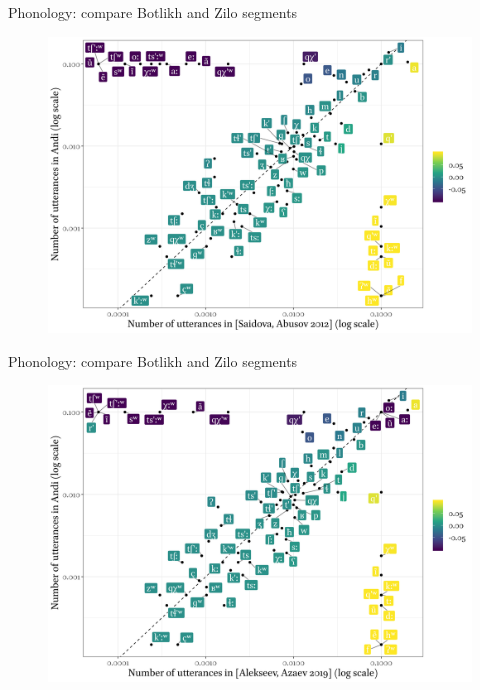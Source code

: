 \begin{frame}{Phonology: compare Botlikh and Zilo segments}
\begin{figure}[h]
\centering
\includegraphics[width = \linewidth]{images/06_compare_botlikh_zilo.png}
\end{figure}
\end{frame}

\begin{frame}{Phonology: compare Botlikh and Zilo segments}
\begin{figure}[h]
\centering
\includegraphics[width = \linewidth]{images/07_compare_botlikh_zilo.png}
\end{figure}
\end{frame}

